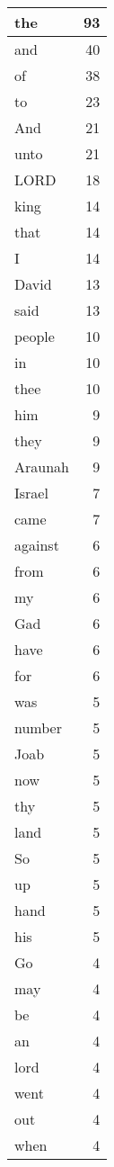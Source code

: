 \begin{center}
\begin{longtable}{l|r}
\hline \hline
\endlastfoot
the & 93 \\ \hline
and & 40 \\ \hline
of & 38 \\ \hline
to & 23 \\ \hline
And & 21 \\ \hline
unto & 21 \\ \hline
LORD & 18 \\ \hline
king & 14 \\ \hline
that & 14 \\ \hline
I & 14 \\ \hline
David & 13 \\ \hline
said & 13 \\ \hline
people & 10 \\ \hline
in & 10 \\ \hline
thee & 10 \\ \hline
him & 9 \\ \hline
they & 9 \\ \hline
Araunah & 9 \\ \hline
Israel & 7 \\ \hline
came & 7 \\ \hline
against & 6 \\ \hline
from & 6 \\ \hline
my & 6 \\ \hline
Gad & 6 \\ \hline
have & 6 \\ \hline
for & 6 \\ \hline
was & 5 \\ \hline
number & 5 \\ \hline
Joab & 5 \\ \hline
now & 5 \\ \hline
thy & 5 \\ \hline
land & 5 \\ \hline
So & 5 \\ \hline
up & 5 \\ \hline
hand & 5 \\ \hline
his & 5 \\ \hline
Go & 4 \\ \hline
may & 4 \\ \hline
be & 4 \\ \hline
an & 4 \\ \hline
lord & 4 \\ \hline
went & 4 \\ \hline
out & 4 \\ \hline
when & 4 \\ \hline

\end{longtable}
\end{center}
